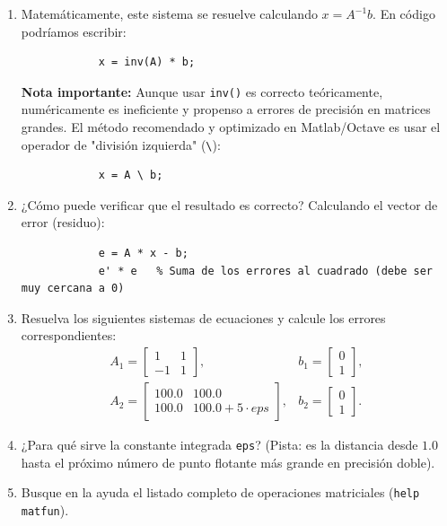 \begin{enumerate}
	\begin{enumerate}
		\item Matemáticamente, este sistema se resuelve calculando $x = A^{-1}b$. En código podríamos escribir:
		\begin{verbatim}
			x = inv(A) * b;
		\end{verbatim}
		\textbf{Nota importante:} Aunque usar \texttt{inv()} es correcto teóricamente, numéricamente es ineficiente y propenso a errores de precisión en matrices grandes. El método recomendado y optimizado en Matlab/Octave es usar el operador de "división izquierda" (\texttt{\textbackslash}):
		\begin{verbatim}
			x = A \ b;
		\end{verbatim}
		
		\item ¿Cómo puede verificar que el resultado es correcto? Calculando el vector de error (residuo):
		\begin{verbatim}
			e = A * x - b;
			e' * e   % Suma de los errores al cuadrado (debe ser muy cercana a 0)
		\end{verbatim}
		
		\item Resuelva los siguientes sistemas de ecuaciones y calcule los errores correspondientes:
		\begin{eqnarray}
			A_{1} = \begin{bmatrix} 1 & 1 \\ -1 & 1 \end{bmatrix}, & b_{1} = \begin{bmatrix} 0 \\ 1 \end{bmatrix}, \\
			A_{2} = \begin{bmatrix} 100.0 & 100.0 \\ 100.0 & 100.0 + 5 \cdot eps \end{bmatrix}, & b_{2} = \begin{bmatrix} 0 \\ 1 \end{bmatrix}.
		\end{eqnarray}
		
		\item ¿Para qué sirve la constante integrada \texttt{eps}? (Pista: es la distancia desde $1.0$ hasta el próximo número de punto flotante más grande en precisión doble).
		
		\item Busque en la ayuda el listado completo de operaciones matriciales (\texttt{help matfun}).
	\end{enumerate}
\end{enumerate}

